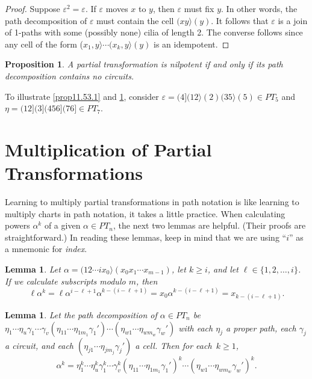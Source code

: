 \documentclass{surv-l}
\numberwithin{equation}{section}
\numberwithin{table}{section}
\numberwithin{figure}{section}
\theoremstyle{plain}
\newtheorem{lemma}[equation]{Lemma}
\newtheorem{proposition}[equation]{Proposition}
\theoremstyle{definition}
\begin{document}
\begin{proof}Suppose $\varepsilon^{2}=\varepsilon$. If $\varepsilon$ moves $x$ to
$y$, then $\varepsilon$ must fix $y$. In other words, the path
decomposition of $\varepsilon$ must contain the cell
$(xy\rangle(y)$. It follows that $\varepsilon$ is a join of
1-paths with some (possibly none) cilia of length 2. The converse
follows since any cell of the form ($x_{1}, y\rangle \cdots(x_{k},
y\rangle(y)$ is an idempotent.
\end{proof}

\begin{proposition}\label{prop11.53.2}
A partial transformation is nilpotent if and only if its path
decomposition contains no circuits.
\end{proposition}

To illustrate \ref{prop11.53.1} and \ref{prop11.53.2}, consider
$\varepsilon=(4](12\rangle(2)(35\rangle(5)\in PT_{5}$ and
$\eta=(12](3](456](76]\in PT_{7}$.

\section{Multiplication of Partial Transformations}\label{sec11.54}

Learning to multiply partial transformations in path notation is
like learning to multiply charts in path notation, it takes a
little practice. When calculating powers $\alpha^{k}$ of a given
$\alpha\in PT_{n}$, the next two lemmas are helpful. (Their proofs
are straightforward.) In reading these lemmas, keep in mind that
we are using ``$i$'' as a mnemonic for \emph{index}.

\begin{lemma}\label{lem11.54.1}
Let $\alpha=(12\cdots ix_{0}\rangle(x_{0}x_{1}\cdots x_{m-1})$,
let $k\geq i$, and let $\ell\in\{1,2,\ldots, i\}$. If we calculate
subscripts modulo $m$, then
\[
\ell\alpha^{k}=\ell\alpha^{i-\ell+1}\alpha^{k-(i-\ell+1)}=x_{0}\alpha^{k-(i-\ell+1)}=x_{k-(i-\ell+1)}.
\]
\end{lemma}

\begin{lemma}\label{lem11.54.2}
Let the path decomposition of $\alpha\in
PT_{n}$ be
$\eta_{1}\cdots\eta_{u}\gamma_{1}\cdots\gamma_{v}(\eta_{11}\cdots\eta_{1m_{1}}\gamma_{1}') \cdots
(\eta_{w1}\cdots\eta_{wm_{w}}\gamma_{w}')$ with each $\eta_{j}$ a
proper path, each $\gamma_{j}$ a circuit, and each
$(\eta_{j1}\cdots\eta_{jm_{j}}\gamma_{j}')$ a cell. Then for
each~$k\geq 1$,
\[
\alpha^{k}=\eta_{1}^{k}\cdots\eta_{u}^{k}\gamma_{1}^{k}\cdots\gamma_{v}^{k}
(\eta_{11}\cdots\eta_{1m_{1}}\gamma_{1}')^{k}\cdots(\eta_{w1}\cdots\eta_{wm_{w}}\gamma_{w}')^{k}.
\]
\end{lemma}
\end{document}
